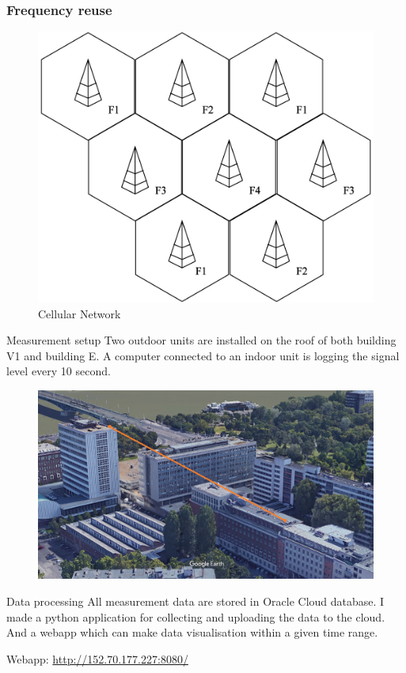 \documentclass{beamer}
\begin{document}
\begin{frame}
    \frametitle{Frequency reuse}
    
    \begin{figure}[h!]
        \centering
        \includegraphics[width=0.9\linewidth]{Frequency_reuse.jpg}
        \caption{Cellular Network}
        \label{fig:Cellular Network}
    \end{figure}
\end{frame}

\begin{frame}{Measurement setup}
    Two outdoor units are installed on the roof of both building V1 and building E. 
    A computer connected to an indoor unit is logging the signal level every 10 second.

    \begin{figure}[h!]
        \centering
        \includegraphics[width=0.9\linewidth]{Google_earth.jpeg}
        \label{fig:google earth}
    \end{figure}
\end{frame}

\begin{frame}{Data processing}
    All measurement data are stored in Oracle Cloud database. I made a python application
    for collecting and uploading the data to the cloud. And a webapp which can make data visualisation 
    within a given time range.

    Webapp: \url{http://152.70.177.227:8080/}
    
\end{frame}
\end{document}
